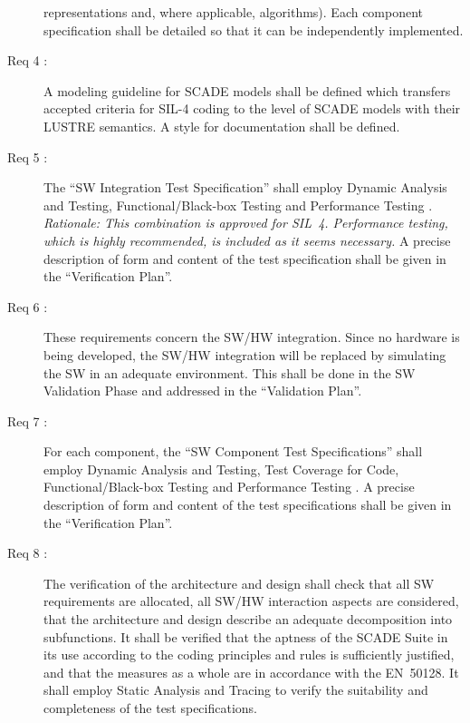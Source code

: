 \documentclass{template/openetcs_article}
\begin{document}
\begin{description}
  representations and, where applicable, algorithms). Each component
  specification shall be detailed so that it can be independently
  implemented.
\item[Req 4 {\cite[7.3.4.25 to 7.4.3.28]{EN50128:2011}}:] A modeling
  guideline for SCADE models shall be defined which transfers accepted
  criteria for SIL-4 coding \cite[A.12]{EN50128:2011} to the level of
  SCADE models with their LUSTRE semantics. A style for documentation
  shall be defined.
\item[Req 5 {\cite[7.3.4.29 to 7.4.3.32]{EN50128:2011}}:] The ``SW
  Integration Test Specification'' shall employ Dynamic Analysis and
  Testing, Functional/Black-box Testing and Performance Testing
  \cite[A.5,A.6]{EN50128:2011}. \emph{Rationale: This combination is
    approved for SIL~4. Performance testing, which is highly
    recommended, is included as it seems necessary.} A precise
  description of form and content of the test specification shall be
  given in the ``Verification Plan''.
\item[Req 6 {\cite[7.3.4.33 to 7.3.4.39]{EN50128:2011}}:] These
  requirements concern the SW/HW integration. Since no
  hardware is being developed, the SW/HW integration will be replaced
  by simulating the SW in an adequate environment. This shall be
  done in the SW Validation Phase and addressed in the ``Validation Plan''.
\item[Req 7 {\cite[7.4.4.7 to 7.4.4.10]{EN50128:2011}}:]
  For each component, the ``SW Component Test Specifications'' shall
  employ Dynamic Analysis and Testing, Test Coverage for Code,
  Functional/Black-box Testing and Performance Testing
  \cite[A.5]{EN50128:2011}.  A precise description of form and content
  of the test specifications shall be given in the ``Verification
  Plan''.
\item[Req 8 {\cite[7.3.4.40 to 7.3.4.43, Sec.~6.1.4]{EN50128:2011}}:]
  The verification of the architecture and design shall check that all
  SW requirements are allocated, all SW/HW interaction aspects are
  considered, that the architecture and design describe an adequate
  decomposition into subfunctions. It shall be verified that the
  aptness of the SCADE Suite in its use according to the coding
  principles and rules is sufficiently justified, and that the
  measures as a whole are in accordance with the EN~50128. It shall
  employ Static Analysis and Tracing to verify the suitability and
  completeness of the test specifications.
\end{description}
\end{document}
